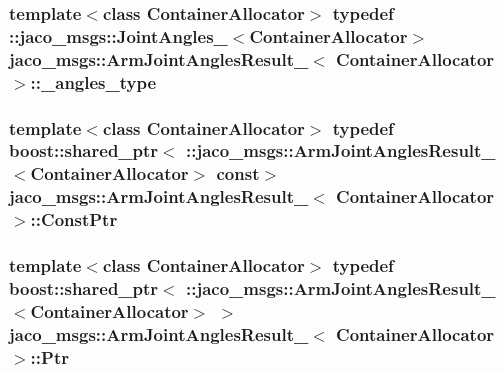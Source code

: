 \subsubsection[{\texorpdfstring{\+\_\+angles\+\_\+type}{_angles_type}}]{\setlength{\rightskip}{0pt plus 5cm}template$<$class Container\+Allocator$>$ typedef \+::{\bf jaco\+\_\+msgs\+::\+Joint\+Angles\+\_\+}$<$Container\+Allocator$>$ {\bf jaco\+\_\+msgs\+::\+Arm\+Joint\+Angles\+Result\+\_\+}$<$ Container\+Allocator $>$\+::{\bf \+\_\+angles\+\_\+type}}\hypertarget{structjaco__msgs_1_1ArmJointAnglesResult___a555b513327e037ed98d9cb6934f77955}{}\label{structjaco__msgs_1_1ArmJointAnglesResult___a555b513327e037ed98d9cb6934f77955}
\subsubsection[{\texorpdfstring{Const\+Ptr}{ConstPtr}}]{\setlength{\rightskip}{0pt plus 5cm}template$<$class Container\+Allocator$>$ typedef boost\+::shared\+\_\+ptr$<$ \+::{\bf jaco\+\_\+msgs\+::\+Arm\+Joint\+Angles\+Result\+\_\+}$<$Container\+Allocator$>$ const$>$ {\bf jaco\+\_\+msgs\+::\+Arm\+Joint\+Angles\+Result\+\_\+}$<$ Container\+Allocator $>$\+::{\bf Const\+Ptr}}\hypertarget{structjaco__msgs_1_1ArmJointAnglesResult___adabfeb1259a1084e46b53afa91fca67b}{}\label{structjaco__msgs_1_1ArmJointAnglesResult___adabfeb1259a1084e46b53afa91fca67b}
\subsubsection[{\texorpdfstring{Ptr}{Ptr}}]{\setlength{\rightskip}{0pt plus 5cm}template$<$class Container\+Allocator$>$ typedef boost\+::shared\+\_\+ptr$<$ \+::{\bf jaco\+\_\+msgs\+::\+Arm\+Joint\+Angles\+Result\+\_\+}$<$Container\+Allocator$>$ $>$ {\bf jaco\+\_\+msgs\+::\+Arm\+Joint\+Angles\+Result\+\_\+}$<$ Container\+Allocator $>$\+::{\bf Ptr}}\hypertarget{structjaco__msgs_1_1ArmJointAnglesResult___a49364d2e8ebfc28e2fa4dcfde4ff835a}{}\label{structjaco__msgs_1_1ArmJointAnglesResult___a49364d2e8ebfc28e2fa4dcfde4ff835a}
